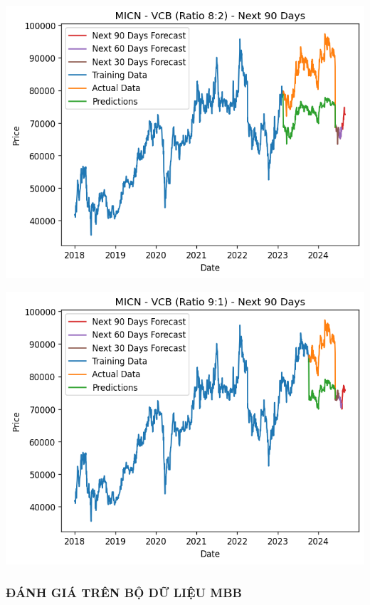 \documentclass[conference]{IEEEtran}
\begin{document}
\begin{minipage}{0.21\textwidth}
    \centering
    \includegraphics[width=\linewidth]{images/MICN/MICN_VCB_82.png}
    \label{fig:image1}
\end{minipage}
\hfill
\begin{minipage}{0.21\textwidth}
    \centering
    \includegraphics[width=\linewidth]{images/MICN/MICN_VCB_91.png}
    \label{fig:image2}
\end{minipage}





\subsubsection{ĐÁNH GIÁ TRÊN BỘ DỮ LIỆU MBB}
\end{document}
